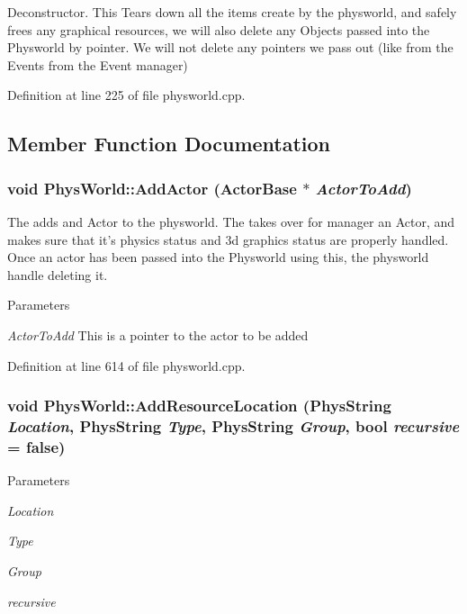Deconstructor. This Tears down all the items create by the physworld, and safely frees any graphical resources, we will also delete any Objects passed into the Physworld by pointer. We will not delete any pointers we pass out (like from the Events from the Event manager) 

Definition at line 225 of file physworld.cpp.

\subsection{Member Function Documentation}
\hypertarget{classPhysWorld_ae490054b3e1c4c5aa69cb8e3b7bd2f29}{
\subsubsection[{AddActor}]{\setlength{\rightskip}{0pt plus 5cm}void PhysWorld::AddActor ({\bf ActorBase} $\ast$ {\em ActorToAdd})}}
\label{db/df5/classPhysWorld_ae490054b3e1c4c5aa69cb8e3b7bd2f29}


The adds and Actor to the physworld. The takes over for manager an Actor, and makes sure that it's physics status and 3d graphics status are properly handled. Once an actor has been passed into the Physworld using this, the physworld handle deleting it. 
\begin{DoxyParams}{Parameters}
\item[{\em ActorToAdd}]This is a pointer to the actor to be added \end{DoxyParams}


Definition at line 614 of file physworld.cpp.\hypertarget{classPhysWorld_a757783fa596bda8ebdbc24234c6b621a}{
\subsubsection[{AddResourceLocation}]{\setlength{\rightskip}{0pt plus 5cm}void PhysWorld::AddResourceLocation (PhysString {\em Location}, \/  PhysString {\em Type}, \/  PhysString {\em Group}, \/  bool {\em recursive} = {\ttfamily false})}}
\label{db/df5/classPhysWorld_a757783fa596bda8ebdbc24234c6b621a}

\begin{DoxyParams}{Parameters}
\item[{\em Location}]\item[{\em Type}]\item[{\em Group}]\item[{\em recursive}]\end{DoxyParams}


